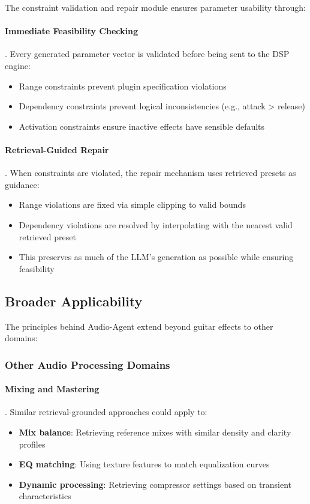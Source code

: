 The constraint validation and repair module ensures parameter usability through:

\paragraph{Immediate Feasibility Checking}. Every generated parameter vector is validated before being sent to the DSP engine:
\begin{itemize}
	\item Range constraints prevent plugin specification violations
	\item Dependency constraints prevent logical inconsistencies (e.g., attack > release)
	\item Activation constraints ensure inactive effects have sensible defaults
\end{itemize}

\paragraph{Retrieval-Guided Repair}. When constraints are violated, the repair mechanism uses retrieved presets as guidance:
\begin{itemize}
	\item Range violations are fixed via simple clipping to valid bounds
	\item Dependency violations are resolved by interpolating with the nearest valid retrieved preset
	\item This preserves as much of the LLM's generation as possible while ensuring feasibility
\end{itemize}

\subsection{Broader Applicability}

The principles behind Audio-Agent extend beyond guitar effects to other domains:

\subsubsection{Other Audio Processing Domains}

\paragraph{Mixing and Mastering}. Similar retrieval-grounded approaches could apply to:
\begin{itemize}
	\item \textbf{Mix balance}: Retrieving reference mixes with similar density and clarity profiles
	\item \textbf{EQ matching}: Using texture features to match equalization curves
	\item \textbf{Dynamic processing}: Retrieving compressor settings based on transient characteristics
\end{itemize}

